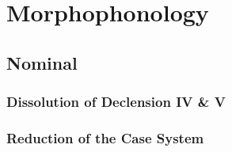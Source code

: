 \documentclass{report}
\begin{document}
\begin{tcolorbox}[title=Elision of Intervocalic /g/]

\end{tcolorbox}

\begin{tcolorbox}[title=Elision of Coda /m/]
  
\end{tcolorbox}

\section{Morphophonology}

\subsection{Nominal}

\subsubsection{Dissolution of Declension IV \& V}

\subsubsection{Reduction of the Case System}
\end{document}
